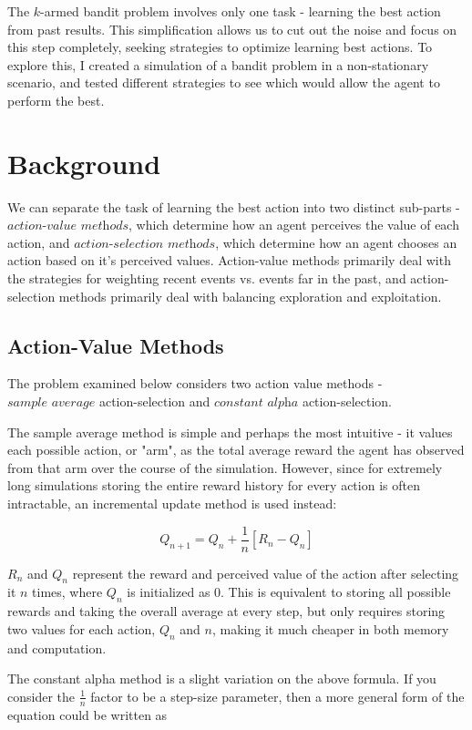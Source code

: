 \documentclass{article}
\begin{document}
The $k$-armed bandit problem involves only one task - learning the best action from past results. This simplification allows us to cut out the noise and focus on this step completely, seeking strategies to optimize learning best actions. To explore this, I created a simulation of a bandit problem in a non-stationary scenario, and tested different strategies to see which would allow the agent to perform the best.

\section{Background}
We can separate the task of learning the best action into two distinct sub-parts - $\textit{action-value methods}$, which determine how an agent perceives the value of each action, and $\textit{action-selection methods}$, which determine how an agent chooses an action based on it's perceived values. Action-value methods primarily deal with the strategies for weighting recent events vs. events far in the past, and action-selection methods primarily deal with balancing exploration and exploitation.

\subsection{Action-Value Methods}
The problem examined below considers two action value methods - $\textit{sample average}$ action-selection and $\textit{constant alpha}$ action-selection. 

The sample average method is simple and perhaps the most intuitive - it values each possible action, or "arm", as the total average reward the agent has observed from that arm over the course of the simulation. However, since for extremely long simulations storing the entire reward history for every action is often intractable, an incremental update method is used instead:

$$Q_{n+1} = Q_n + \frac{1}{n}[R_n - Q_n]$$

$R_n$ and $Q_n$ represent the reward and perceived value of the action after selecting it $n$ times, where $Q_n$ is initialized as 0. This is equivalent to storing all possible rewards and taking the overall average at every step, but only requires storing two values for each action, $Q_n$ and $n$, making it much cheaper in both memory and computation.

The constant alpha method is a slight variation on the above formula. If you consider the $\frac{1}{n}$ factor to be a step-size parameter, then a more general form of the equation could be written as
\end{document}
